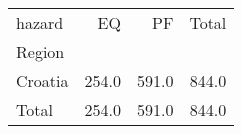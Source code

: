 \begin{tabular}{lrrr}
\toprule
hazard &     EQ &     PF &  Total \\
Region  &        &        &        \\
\midrule
Croatia &  254.0 &  591.0 &  844.0 \\
Total   &  254.0 &  591.0 &  844.0 \\
\bottomrule
\end{tabular}
